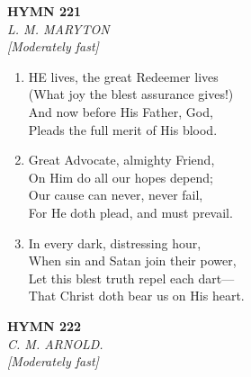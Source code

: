 \newpage
\begin{center}
    {\Large \textbf{HYMN 221}}
    \\
    \textit{L. M. MARYTON}
    \\
    \textit{\small [Moderately fast]}
\end{center}
\vspace{1em}

\begin{enumerate}
    \item HE lives, the great Redeemer lives \\
            (What joy the blest assurance gives!) \\
        And now before His Father, God, \\
            Pleads the full merit of His blood.

    \item Great Advocate, almighty Friend, \\
            On Him do all our hopes depend; \\
        Our cause can never, never fail, \\
            For He doth plead, and must prevail.

    \item In every dark, distressing hour, \\
            When sin and Satan join their power, \\
        Let this blest truth repel each dart--- \\
            That Christ doth bear us on His heart.

\end{enumerate}

\newpage
\begin{center}
    {\Large \textbf{HYMN 222}}
    \\
    \textit{C. M. ARNOLD.}
    \\
    \textit{\small [Moderately fast]}
\end{center}
\vspace{1em}

